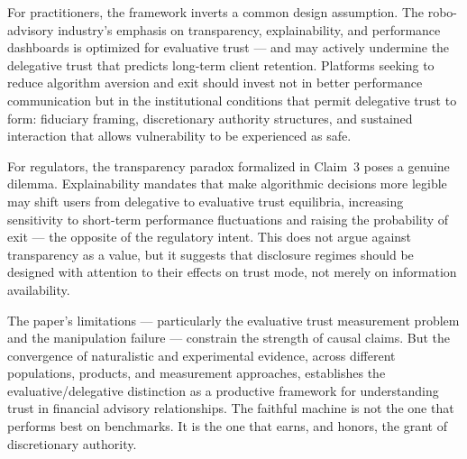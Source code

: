 For practitioners, the framework inverts a common design assumption. The robo-advisory industry's emphasis on transparency, explainability, and performance dashboards is optimized for evaluative trust --- and may actively undermine the delegative trust that predicts long-term client retention. Platforms seeking to reduce algorithm aversion and exit should invest not in better performance communication but in the institutional conditions that permit delegative trust to form: fiduciary framing, discretionary authority structures, and sustained interaction that allows vulnerability to be experienced as safe.

For regulators, the transparency paradox formalized in Claim~3 poses a genuine di\-lemma. Explainability mandates that make algorithmic decisions more legible may shift users from delegative to evaluative trust equilibria, increasing sensitivity to short-term performance fluctuations and raising the probability of exit --- the opposite of the regulatory intent. This does not argue against transparency as a value, but it suggests that disclosure regimes should be designed with attention to their effects on trust mode, not merely on information availability.

The paper's limitations --- particularly the evaluative trust measurement problem and the manipulation failure --- constrain the strength of causal claims. But the convergence of naturalistic and experimental evidence, across different populations, products, and measurement approaches, establishes the evaluative/delegative distinction as a productive framework for understanding trust in financial advisory relationships. The faithful machine is not the one that performs best on benchmarks. It is the one that earns, and honors, the grant of discretionary authority.
